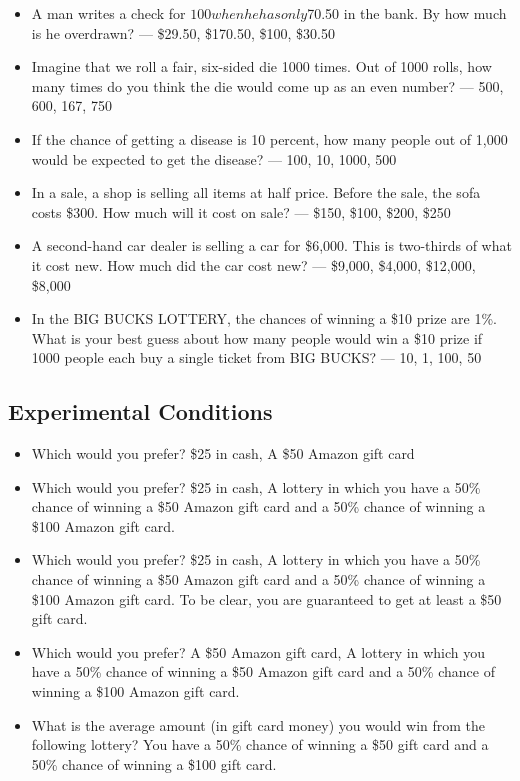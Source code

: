 \documentclass[12pt, letterpaper]{article}
\begin{document}
\begin{itemize}
    \item A man writes a check for $100 when he has only $70.50 in the bank. By how much is he overdrawn? — \$29.50, \$170.50, \$100, \$30.50
    \item Imagine that we roll a fair, six-sided die 1000 times. Out of 1000 rolls, how many times do you think the die would come up as an even number? — 500, 600, 167, 750
    \item If the chance of getting a disease is 10 percent, how many people out of 1,000 would be expected to get the disease? — 100, 10, 1000, 500
    \item In a sale, a shop is selling all items at half price. Before the sale, the sofa costs \$300. How much will it cost on sale? — \$150, \$100, \$200, \$250
    \item A second-hand car dealer is selling a car for \$6,000. This is two-thirds of what it cost new. How much did the car cost new? — \$9,000, \$4,000, \$12,000, \$8,000
    \item In the BIG BUCKS LOTTERY, the chances of winning a \$10 prize are 1\%. What is your best guess about how many people would win a \$10 prize if 1000 people each buy a single ticket from BIG BUCKS? — 10, 1, 100, 50
\end{itemize}

\subsection{Experimental Conditions}

\begin{itemize}
    \item Which would you prefer? \$25 in cash, A \$50 Amazon gift card
    \item Which would you prefer? \$25 in cash, A lottery in which you have a 50\% chance of winning a \$50 Amazon gift card and a 50\% chance of winning a \$100 Amazon gift card.
    \item Which would you prefer? \$25 in cash, A lottery in which you have a 50\% chance of winning a \$50 Amazon gift card and a 50\% chance of winning a \$100 Amazon gift card. To be clear, you are guaranteed to get at least a \$50 gift card.
    \item Which would you prefer? A \$50 Amazon gift card, A lottery in which you have a 50\% chance of winning a \$50 Amazon gift card and a 50\% chance of winning a \$100 Amazon gift card.
    \item What is the average amount (in gift card money) you would win from the following lottery? You have a 50\% chance of winning a \$50 gift card and a 50\% chance of winning a \$100 gift card.
\end{itemize}
\end{document}
